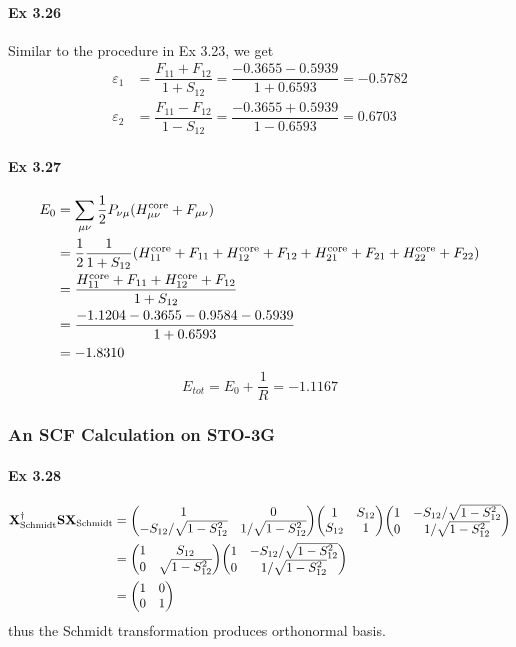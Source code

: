 \documentclass[a4paper]{article}
\DeclareMathOperator{\core}{\mathrm{core}}
\newcommand{\ex}[1]{\paragraph{Ex #1}}
\numberwithin{equation}{subsection}
\begin{document}
\ex{3.26}
Similar to the procedure in Ex 3.23, we get
\begin{align}
\varepsilon_1 &= \dfrac{F_{11} + F_{12}}{1 + S_{12}} = \dfrac{-0.3655 -0.5939}{1 + 0.6593} = -0.5782 \\
\varepsilon_2 &= \dfrac{F_{11} - F_{12}}{1 - S_{12}} = \dfrac{-0.3655 +0.5939}{1 - 0.6593} = 0.6703
\end{align}

\ex{3.27}
\begin{align}
E_0 &= \sum_{\mu\nu} \dfrac{1}{2}P_{\nu\mu} (H^{\core}_{\mu\nu} + F_{\mu\nu}) \notag\\
&= \dfrac{1}{2}\dfrac{1}{1 + S_{12}} \qty(H^{\core}_{11} + F_{11} + H^{\core}_{12} + F_{12} + H^{\core}_{21} + F_{21} + H^{\core}_{22} + F_{22}) \notag\\
&= \dfrac{H^{\core}_{11} + F_{11} + H^{\core}_{12} + F_{12}}{1 + S_{12}} \notag\\
&= \dfrac{-1.1204 -0.3655 - 0.9584 - 0.5939}{1 + 0.6593} \notag\\
&= -1.8310
\end{align}
\begin{equation}\label{key}
E_{tot} = E_0 + \dfrac{1}{R} = -1.1167
\end{equation}

\subsubsection{An SCF Calculation on STO-3G }
\ex{3.28}
\begin{align}
\vb{X}^\dagger_{\text{Schmidt}} \vb{S} \vb{X}_{\text{Schmidt}} &= \mqty(1 & 0 \\ -S_{12}/\sqrt{1-S_{12}^2} & 1/\sqrt{1-S_{12}^2}) 
\mqty(1 & S_{12} \\ S_{12} & 1) 
\mqty(1 & -S_{12}/\sqrt{1-S_{12}^2}\\ 0 & 1/\sqrt{1-S_{12}^2}) \notag\\
&= \mqty(1 & S_{12} \\ 0 & \sqrt{1-S_{12}^2}) 
\mqty(1 & -S_{12}/\sqrt{1-S_{12}^2}\\ 0 & 1/\sqrt{1-S_{12}^2}) \notag\\
&= \mqty(1 & 0\\ 0 & 1)
\end{align}
thus the Schmidt transformation produces orthonormal basis.
\end{document}
